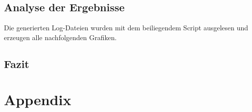\documentclass[12pt, a4paper]{scrartcl}
\begin{document}
\subsection{Analyse der Ergebnisse}
Die generierten Log-Dateien wurden mit dem beiliegendem Script ausgelesen und erzeugen alle nachfolgenden Grafiken.
\subsection{Fazit}

\newpage
\renewcommand{\thesubsection}{\Alph{subsection}}
\setcounter{page}{\value{lastroman}}
\section*{Appendix}


\newpage
\listoffigures

\end{document}
